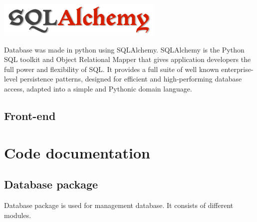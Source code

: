 \documentclass[12pt]{article}
\begin{document}
\includegraphics{images/sqla.png}

Database was made in python using SQLAlchemy. SQLAlchemy is the Python SQL toolkit and Object Relational Mapper that gives application developers the full power and flexibility of SQL. It provides a full suite of well known enterprise-level persistence patterns, designed for efficient and high-performing database access, adapted into a simple and Pythonic domain language.




\subsection{Front-end}

\section{Code documentation}

\subsection{Database package}

Database package is used for management database. It consists of different modules.
\end{document}
